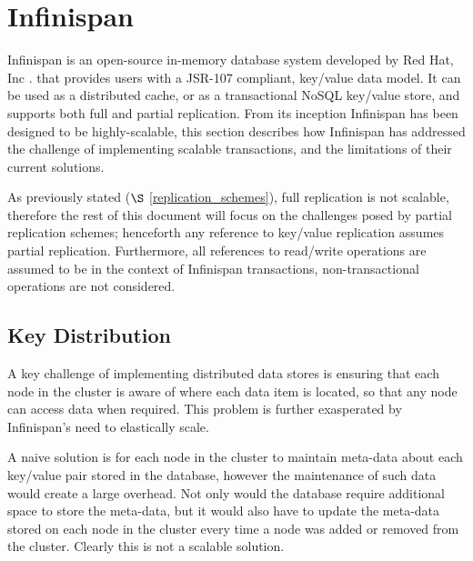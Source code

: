 
\section{Infinispan}\label{sec:infinispan}
Infinispan \citep{Infinispan, marchioni2012infinispan} is an open-source in-memory database system developed by Red Hat, Inc \citep{RedHat}. that provides users with a JSR-107 \citep{JSR-107} compliant, key/value data model.  It can be used as a distributed cache, or as a transactional NoSQL key/value store, and supports both full and partial replication.  From its inception Infinispan has been designed  to be highly-scalable, this section describes how Infinispan has addressed the challenge of implementing scalable transactions, and the limitations of their current solutions.  

As previously stated ($\S$ \ref{replication_schemes}), full replication is not scalable, therefore the rest of this document will focus on the challenges posed by partial replication schemes; henceforth any reference to key/value replication assumes partial replication.  Furthermore, all references to read/write operations are assumed to be in the context of Infinispan transactions, non-transactional operations are not considered.  

    \subsection{Key Distribution}
    A key challenge of implementing distributed data stores is ensuring that each node in the cluster is aware of where each data item is located, so that any node can access data when required.  This problem is further exasperated by Infinispan's need to elastically scale.  
    
    A naive solution is for each node in the cluster to maintain meta-data about each key/value pair stored in the database, however the maintenance of such data would create a large overhead.  Not only would the database require additional space to store the meta-data, but it would also have to update the meta-data stored on each node in the cluster every time a node was added or removed from the cluster.  Clearly this is not a scalable solution.  
    
